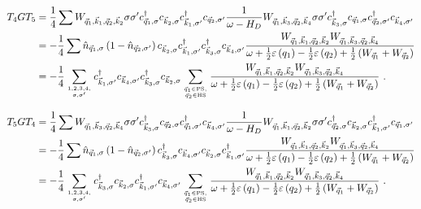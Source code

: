 \documentclass{revtex4-2}
\begin{document}
\begin{equation}\begin{aligned}
	T_4 G T_5 &= \frac{1}{4}\sum  W_{\vec q_1,\vec k_1, \vec q_2, \vec k_2} \sigma\sigma^\prime c^\dagger_{\vec q_1,\sigma}c_{\vec k_2,\sigma}c^\dagger_{\vec k_1,\sigma^\prime}c_{\vec q_2,\sigma^\prime} \frac{1}{\omega - H_D}W_{\vec q_1, \vec k_3, \vec q_2, \vec k_4} \sigma\sigma^\prime c^\dagger_{\vec k_3,\sigma}c_{\vec q_1,\sigma}c^\dagger_{\vec q_2,\sigma^\prime}c_{\vec k_4,\sigma^\prime}\\
		  &= -\frac{1}{4}\sum \hat n_{\vec q_1,\sigma} \left(1 - \hat n_{\vec q_2,\sigma^\prime}\right) c_{\vec k_2,\sigma} c^\dagger_{\vec k_1,\sigma^\prime}c^\dagger_{\vec k_3,\sigma}c_{\vec k_4,\sigma^\prime} \frac{W_{\vec q_1,\vec k_1, \vec q_2, \vec k_2} W_{\vec q_1, \vec k_3, \vec q_2, \vec k_4}}{\omega + \frac{1}{2}\varepsilon\left(q_1\right) - \frac{1}{2}\varepsilon\left(q_2\right) + \frac{1}{2}\left(W_{\vec q_1} + W_{\vec q_2}\right)}  \\
		  &= -\frac{1}{4}\sum_{1,2,3,4,\atop{\sigma,\sigma^\prime}} c^\dagger_{\vec k_1,\sigma^\prime}c_{\vec k_4,\sigma^\prime}c^\dagger_{\vec k_3,\sigma} c_{\vec k_2,\sigma} \sum_{\vec q_1 \in \text{PS}, \atop{\vec q_2 \in \text{HS}}}\frac{W_{\vec q_1,\vec k_1, \vec q_2, \vec k_2} W_{\vec q_1, \vec k_3, \vec q_2, \vec k_4}}{\omega + \frac{1}{2}\varepsilon\left(q_1\right) - \frac{1}{2}\varepsilon\left(q_2\right) + \frac{1}{2}\left(W_{\vec q_1} + W_{\vec q_2}\right)}~.
\end{aligned}\end{equation}

\begin{equation}\begin{aligned}
	T_5 G T_4 &= \frac{1}{4}\sum W_{\vec q_1, \vec k_3, \vec q_2, \vec k_4} \sigma\sigma^\prime c^\dagger_{\vec k_3,\sigma}c_{\vec q_2,\sigma}c^\dagger_{\vec q_1,\sigma^\prime}c_{\vec k_4,\sigma^\prime} \frac{1}{\omega - H_D} W_{\vec q_1,\vec k_1, \vec q_2, \vec k_2} \sigma\sigma^\prime c^\dagger_{\vec q_2,\sigma}c_{\vec k_2,\sigma}c^\dagger_{\vec k_1,\sigma^\prime}c_{\vec q_1,\sigma^\prime}\\
		  &= -\frac{1}{4}\sum \hat n_{\vec q_1,\sigma} \left(1 - \hat n_{\vec q_2,\sigma^\prime}\right) c^\dagger_{\vec k_3,\sigma}c_{\vec k_4,\sigma^\prime} c_{\vec k_2,\sigma} c^\dagger_{\vec k_1,\sigma^\prime} \frac{W_{\vec q_1,\vec k_1, \vec q_2, \vec k_2} W_{\vec q_1, \vec k_3, \vec q_2, \vec k_4}}{\omega + \frac{1}{2}\varepsilon\left(q_1\right) - \frac{1}{2}\varepsilon\left(q_2\right) + \frac{1}{2}\left(W_{\vec q_1} + W_{\vec q_2}\right)}  \\
		  &= -\frac{1}{4}\sum_{1,2,3,4,\atop{\sigma,\sigma^\prime}} c^\dagger_{\vec k_3,\sigma} c_{\vec k_2,\sigma} c^\dagger_{\vec k_1,\sigma^\prime}c_{\vec k_4,\sigma^\prime}\sum_{\vec q_1 \in \text{PS}, \atop{\vec q_2 \in \text{HS}}}\frac{W_{\vec q_1,\vec k_1, \vec q_2, \vec k_2} W_{\vec q_1, \vec k_3, \vec q_2, \vec k_4}}{\omega + \frac{1}{2}\varepsilon\left(q_1\right) - \frac{1}{2}\varepsilon\left(q_2\right) + \frac{1}{2}\left(W_{\vec q_1} + W_{\vec q_2}\right)}~.
\end{aligned}\end{equation}
\end{document}
